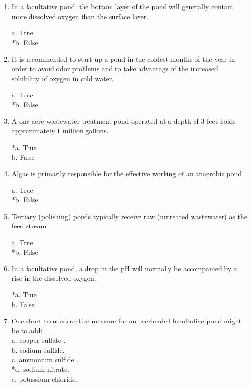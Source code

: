 \begin{enumerate}
\item  In a facultative pond, the bottom layer of the pond will generally contain more dissolved oxygen than the surface layer.

a. True \\
*b. False 


\item  It is recommended to start up a pond in the coldest months of the year in order to avoid odor problems and to take advantage of the increased solubility of oxygen in cold water.

a. True \\
*b. False 


\item  A one acre wastewater treatment pond operated at a depth of 3 feet holds approximately 1 million gallons.

*a. True \\
b. False 


\item  Algae is primarily responsible for the effective working of an anaerobic pond

a. True \\
*b. False 


\item  Tertiary (polishing) ponds typically receive raw (untreated wastewater) as the feed stream

a. True \\
*b. False \\

\item  In a facultative pond, a drop in the pH will normally be accompanied by a rise in the dissolved oxygen.

*a. True \\
b. False 


\item  One short-term corrective measure for an overloaded facultative pond might be to add:\\


a. copper sulfate . \\

b. sodium sulfide. \\

c. ammonium sulfide . \\

*d. sodium nitrate. \\

e. potassium chloride. \\



\end{enumerate}
